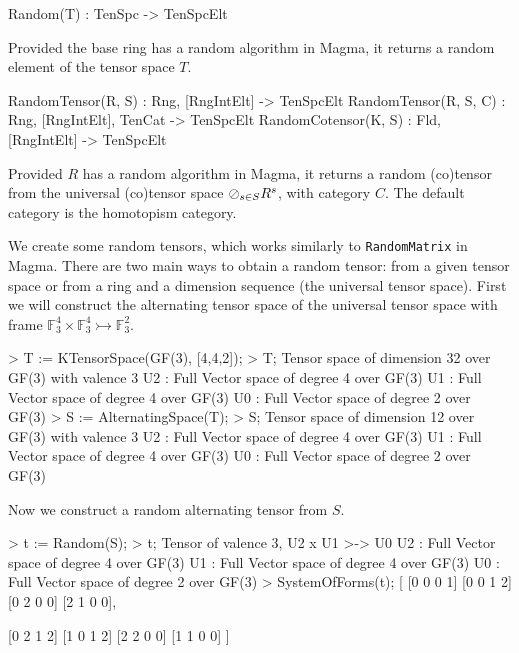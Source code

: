 \begin{intrinsics}
Random(T) : TenSpc -> TenSpcElt
\end{intrinsics}

Provided the base ring has a random algorithm in Magma, it returns a random 
element of the tensor space $T$.

\begin{intrinsics}
RandomTensor(R, S) : Rng, [RngIntElt] -> TenSpcElt
RandomTensor(R, S, C) : Rng, [RngIntElt], TenCat -> TenSpcElt
RandomCotensor(K, S) : Fld, [RngIntElt] -> TenSpcElt
\end{intrinsics}

Provided $R$ has a random algorithm in Magma, it returns a random (co)tensor from 
the universal (co)tensor space $\oslash_{s\in S} R^{s}$, with category $C$.
The default category is the homotopism category.

\begin{example}[RandomTensors]

We create some random tensors, which works similarly to \texttt{RandomMatrix} in
Magma. There are two main ways to obtain a random tensor: from a given tensor
space or from a ring and a dimension sequence (the universal tensor space).
First we will construct the alternating tensor space of the universal tensor
space with frame $\mathbb{F}_3^4\times\mathbb{F}_3^4\rightarrowtail
\mathbb{F}_3^2$.
\begin{code}
> T := KTensorSpace(GF(3), [4,4,2]);
> T;
Tensor space of dimension 32 over GF(3) with valence 3
U2 : Full Vector space of degree 4 over GF(3)
U1 : Full Vector space of degree 4 over GF(3)
U0 : Full Vector space of degree 2 over GF(3)
> S := AlternatingSpace(T);
> S;
Tensor space of dimension 12 over GF(3) with valence 3
U2 : Full Vector space of degree 4 over GF(3)
U1 : Full Vector space of degree 4 over GF(3)
U0 : Full Vector space of degree 2 over GF(3)
\end{code}

Now we construct a random alternating tensor from $S$.
\begin{code}
> t := Random(S);
> t;
Tensor of valence 3, U2 x U1 >-> U0
U2 : Full Vector space of degree 4 over GF(3)
U1 : Full Vector space of degree 4 over GF(3)
U0 : Full Vector space of degree 2 over GF(3)
> SystemOfForms(t);
[
    [0 0 0 1]
    [0 0 1 2]
    [0 2 0 0]
    [2 1 0 0],

    [0 2 1 2]
    [1 0 1 2]
    [2 2 0 0]
    [1 1 0 0]
]
\end{code}
\end{example}

